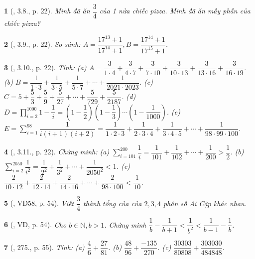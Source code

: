 \documentclass{article}
\newtheorem{baitoan}{}
\begin{document}
\begin{baitoan}[\cite{Binh_boi_duong_Toan_6_tap_2}, 3.8., p. 22]
	Minh đã ăn $\dfrac{3}{4}$ của 1 nửa chiếc pizza. Minh đã ăn mấy phần của chiếc pizza?
\end{baitoan}

\begin{baitoan}[\cite{Binh_boi_duong_Toan_6_tap_2}, 3.9., p. 22]
	So sánh: $A = \dfrac{17^{13} + 1}{17^{14} + 1},B = \dfrac{17^{14} + 1}{17^{15} + 1}$.
\end{baitoan}

\begin{baitoan}[\cite{Binh_boi_duong_Toan_6_tap_2}, 3.10., p. 22]
	Tính: (a) $A = \dfrac{3}{1\cdot4} + \dfrac{3}{4\cdot7} + \dfrac{3}{7\cdot10} + \dfrac{3}{10\cdot13} + \dfrac{3}{13\cdot16} + \dfrac{3}{16\cdot19}$. (b) $B = \dfrac{1}{1\cdot3} + \dfrac{1}{3\cdot5} + \dfrac{1}{5\cdot7} + \cdots + \dfrac{1}{2021\cdot2023}$. (c) $C = 5 + \dfrac{5}{3} + \dfrac{5}{9} + \dfrac{5}{27} + \cdots + \dfrac{5}{729} + \dfrac{5}{2187}$. (d) $D = \prod_{i=2}^{1000} 1 - \dfrac{1}{i} = \left(1 - \dfrac{1}{2}\right)\left(1 - \dfrac{1}{3}\right)\cdots\left(1 - \dfrac{1}{1000}\right)$. (e) $E = \sum_{i=1}^{98} \dfrac{1}{i(i + 1)(i + 2)} = \dfrac{1}{1\cdot2\cdot3} + \dfrac{1}{2\cdot3\cdot4} + \dfrac{1}{3\cdot4\cdot5} + \cdots + \dfrac{1}{98\cdot99\cdot100}$.
\end{baitoan}

\begin{baitoan}[\cite{Binh_boi_duong_Toan_6_tap_2}, 3.11., p. 22]
	Chứng minh: (a) $\sum_{i=101}^{200} \dfrac{1}{i} = \dfrac{1}{101} + \dfrac{1}{102} + \cdots + \dfrac{1}{200} > \dfrac{1}{2}$. (b) $\sum_{i=2}^{2050} \dfrac{1}{i^2} = \dfrac{1}{2^2} + \dfrac{1}{3^2} + \cdots + \dfrac{1}{2050^2} < 1$. (c) $\dfrac{2}{10\cdot12} + \dfrac{2}{12\cdot14} + \dfrac{2}{14\cdot16} + \cdots + \dfrac{2}{98\cdot100} < \dfrac{1}{10}$.
\end{baitoan}

\begin{baitoan}[\cite{Tuyen_Toan_6}, VD58, p. 54]
	Viết $\dfrac{3}{4}$ thành tổng của của $2,3,4$ phân số Ai Cập khác nhau.
\end{baitoan}

\begin{baitoan}[\cite{Tuyen_Toan_6}, VD, p. 54]
	Cho $b\in\mathbb{N},b > 1$. Chứng minh $\dfrac{1}{b} - \dfrac{1}{b + 1} < \dfrac{1}{b^2} < \dfrac{1}{b - 1} - \dfrac{1}{b}$.
\end{baitoan}

\begin{baitoan}[\cite{Tuyen_Toan_6}, 275., p. 55]
	Tính: (a) $\dfrac{4}{6} + \dfrac{27}{81}$. (b) $\dfrac{48}{96} + \dfrac{-135}{270}$. (c) $\dfrac{30303}{80808} + \dfrac{303030}{484848}$.
\end{baitoan}
\end{document}
